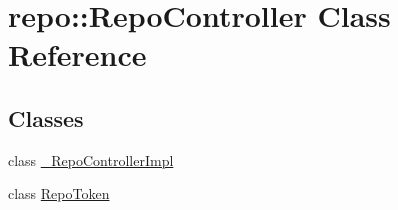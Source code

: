 \hypertarget{classrepo_1_1_repo_controller}{}\section{repo\+:\+:Repo\+Controller Class Reference}
\label{classrepo_1_1_repo_controller}
\subsection*{Classes}
\begin{DoxyCompactItemize}
\item 
class \hyperlink{class_repo_controller_1_1___repo_controller_impl}{\+\_\+\+Repo\+Controller\+Impl}
\item 
class \hyperlink{class_repo_controller_1_1_repo_token}{Repo\+Token}
\end{DoxyCompactItemize}
